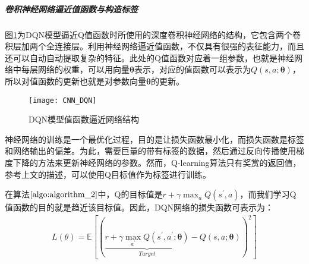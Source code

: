 
 \subparagraph{卷积神经网络逼近值函数与构造标签}
图\ref{fig:CNN_DQN}为DQN模型逼近Q值函数时所使用的深度卷积神经网络的结构，它包含两个卷积层加两个全连接层。利用神经网络逼近值函数，不仅具有很强的表征能力，而且还可以自动自动提取复杂的特征。此处的Q值函数对应着一组参数，也就是神经网络中每层网络的权重，可以用向量$\bm{\theta}$表示，对应的值函数可以表示为$Q(s,a;\bm{\theta})$，所以对值函数的更新也就是对参数向量$\bm{\theta}$的更新。
\begin{figure}[htbp]
\centering
\texttt{[image: CNN\_DQN]}
\caption{DQN模型值函数逼近网络结构}
\label{fig:CNN_DQN}
\end{figure}

神经网络的训练是一个最优化过程，目的是让损失函数最小化，而损失函数是标签和网络输出的偏差。为此，需要巨量的带有标签的数据，然后通过反向传播使用梯度下降的方法来更新神经网络的参数。然而，Q-learning算法只有奖赏的返回值，参考上文的描述，可以使用Q目标值作为标签进行训练。

在算法$\ref{algo:algorithm_2}$中，Q的目标值是$r+\gamma \max_{a}Q(s^{'},a)$，而我们学习Q值函数的目的就是趋近该目标值。因此，DQN网络的损失函数可表示为：
\begin{equation}
\label{seq_3_2_1}
\begin{aligned}
L(\theta)=\mathbb{E}[(\underbrace{r+\gamma\max_{a^{'}} Q(s^{'},a^{'};\bm{\theta})}_{Target}-Q(s,a;\bm{\theta}))^{2}]
\end{aligned}
\end{equation}

